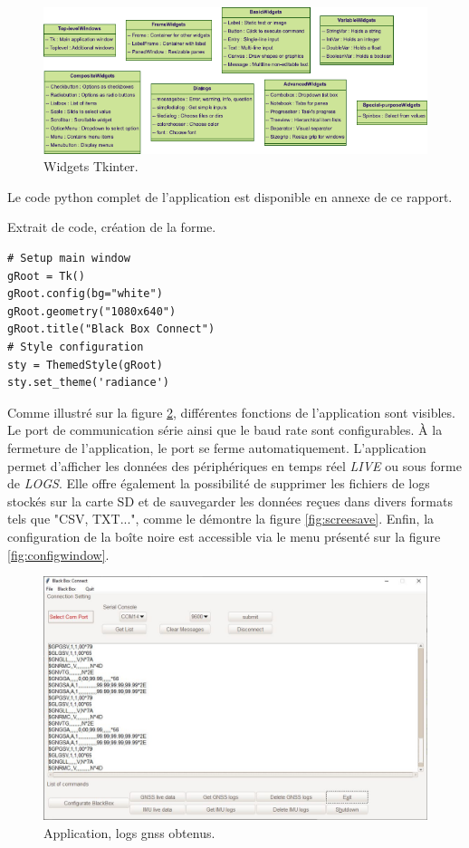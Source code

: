 \begin{figure}[h]
	\centering
	\includegraphics[width=.9\linewidth]{../figures/application/tkinter}
	\caption{Widgets Tkinter.}
	\label{fig:tkinter}
\end{figure}

Le code python complet de l'application est disponible en annexe de ce rapport.

\begin{code}
\caption{Extrait de code, création de la forme.}
\label{code:pythonExample}
\vspace*{-3mm}
\begin{verbatim}
# Setup main window
gRoot = Tk()
gRoot.config(bg="white")
gRoot.geometry("1080x640")
gRoot.title("Black Box Connect")
# Style configuration
sty = ThemedStyle(gRoot)
sty.set_theme('radiance') 
\end{verbatim}
\end{code}

\clearpage

Comme illustré sur la figure \ref{fig:screenloggnss}, différentes fonctions de l'application sont visibles. Le port de communication série ainsi que le baud rate sont configurables. À la fermeture de l'application, le port se ferme automatiquement. L'application permet d'afficher les données des périphériques en temps réel \textit{LIVE} ou sous forme de \textit{LOGS}. Elle offre également la possibilité de supprimer les fichiers de logs stockés sur la carte SD et de sauvegarder les données reçues dans divers formats tels que "CSV, TXT...", comme le démontre la figure \ref{fig:screesave}. Enfin, la configuration de la boîte noire est accessible via le menu présenté sur la figure \ref{fig:configwindow}.

\begin{figure}[H]
	\centering
	\includegraphics[width=.75\linewidth]{../figures/application/screen_logGnss}
	\caption{Application, logs \gls{gnss} obtenus.}
	\label{fig:screenloggnss}
\end{figure}

